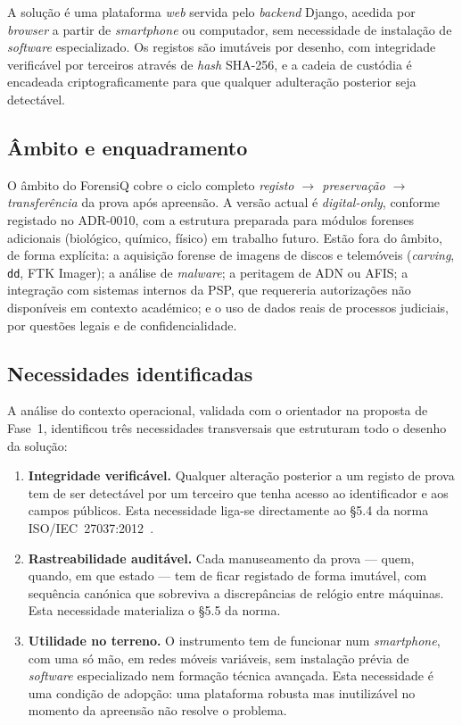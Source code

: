 A solução é uma plataforma \emph{web} servida pelo \emph{backend}
Django, acedida por \emph{browser} a partir de \emph{smartphone} ou
computador, sem necessidade de instalação de \emph{software}
especializado. Os registos são imutáveis por desenho, com integridade
verificável por terceiros através de \emph{hash} SHA-256, e a cadeia
de custódia é encadeada criptograficamente para que qualquer
adulteração posterior seja detectável.

\subsection{Âmbito e enquadramento}
\label{sec:ambito}

O âmbito do ForensiQ cobre o ciclo completo \emph{registo $\rightarrow$
preservação $\rightarrow$ transferência} da prova após apreensão.
A versão actual é \emph{digital-only}, conforme registado no ADR-0010,
com a estrutura preparada para módulos forenses adicionais (biológico,
químico, físico) em trabalho futuro. Estão fora do âmbito, de forma
explícita: a aquisição forense de imagens de discos e telemóveis
(\emph{carving}, \texttt{dd}, FTK Imager); a análise de \emph{malware};
a peritagem de ADN ou AFIS; a integração com sistemas internos da PSP,
que requereria autorizações não disponíveis em contexto académico; e
o uso de dados reais de processos judiciais, por questões legais e de
confidencialidade.

\subsection{Necessidades identificadas}
\label{sec:necessidades}

A análise do contexto operacional, validada com o orientador na
proposta de Fase~1, identificou três necessidades transversais que
estruturam todo o desenho da solução:

\begin{enumerate}
    \item \textbf{Integridade verificável.} Qualquer alteração posterior
          a um registo de prova tem de ser detectável por um terceiro
          que tenha acesso ao identificador e aos campos públicos.
          Esta necessidade liga-se directamente ao \S5.4 da norma
          ISO/IEC~27037:2012~\citep{iso27037}.
    \item \textbf{Rastreabilidade auditável.} Cada manuseamento da prova
          --- quem, quando, em que estado --- tem de ficar registado de
          forma imutável, com sequência canónica que sobreviva a
          discrepâncias de relógio entre máquinas. Esta necessidade
          materializa o \S5.5 da norma.
    \item \textbf{Utilidade no terreno.} O instrumento tem de funcionar
          num \emph{smartphone}, com uma só mão, em redes móveis
          variáveis, sem instalação prévia de \emph{software}
          especializado nem formação técnica avançada. Esta necessidade
          é uma condição de adopção: uma plataforma robusta mas
          inutilizável no momento da apreensão não resolve o problema.
\end{enumerate}

